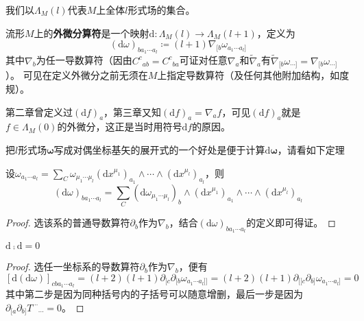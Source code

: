 我们以$\Lambda_M(l)$代表$M$上全体$l$形式场的集合。

\begin{definition}
    流形$M$上的\textbf{外微分算符}是一个映射$\mathrm{d} \colon \Lambda_M(l) \to \Lambda_M(l + 1)$，定义为
    $$(\mathrm{d}\omega)_{b a_1 \cdots a_l} \coloneq (l + 1)\nabla_{[b}\omega_{a_1 \cdots a_l]}$$
    其中$\nabla_b$为任一导数算符（因由$C^c{}_{ab} = C^c{}_{ba}$可证对任意$\nabla_a$和$\tilde\nabla_a$有$\tilde\nabla_{[b}\omega_{\cdots]} = \nabla_{[b}\omega_{\cdots]}$）。
    可见在定义外微分之前无须在$M$上指定导数算符（及任何其他附加结构，如度规）。
\end{definition}

\begin{example}
    第二章曾定义过$(\mathrm{d}f)_a$，第三章又知$(\mathrm{d}f)_a = \nabla_af$，可见$(\mathrm{d}f)_a$就是$f \in \Lambda_M(0)$的外微分，这正是当时用符号$\mathrm{d}f$的原因。
\end{example}

把$l$形式场$\bm\omega$写成对偶坐标基矢的展开式的一个好处是便于计算$\mathrm{d}\bm\omega$，请看如下定理

\begin{theorem}
    设$\omega_{a_1 \cdots a_l} = \sum\limits_C \omega_{\mu_1 \cdots \mu_l}(\mathrm{d}x^{\mu_1})_{a_1} \wedge \cdots \wedge (\mathrm{d}x^{\mu_l})_{a_l}$，则
    $$(\mathrm{d}\omega)_{b a_1 \cdots a_l} = \sum_C (\mathrm{d}\omega_{\mu_1 \cdots \mu_l})_b \wedge (\mathrm{d}x^{\mu_1})_{a_1} \wedge \cdots \wedge (\mathrm{d}x^{\mu_l})_{a_l}$$
\end{theorem}

\begin{proof}
    选该系的普通导数算符$\partial_b$作为$\nabla_b$，结合$(\mathrm{d}\omega)_{b a_1 \cdots a_l}$的定义即可得证。
\end{proof}

\begin{theorem}
    $\mathrm{d} \comp \mathrm{d} = 0$
\end{theorem}

\begin{proof}
    选任一坐标系的导数算符$\partial_b$作为$\nabla_b$，便有
    $$[\mathrm{d}(\mathrm{d}\omega)]_{c b a_1 \cdots a_l} = (l + 2)(l + 1)\partial_{[c}\partial_{[b}\omega_{a_1 \cdots a_l]]} = (l + 2)(l + 1)\partial_{[[c}\partial_{b]}\omega_{a_1 \cdots a_l]} = 0$$
    其中第二步是因为同种括号内的子括号可以随意增删，最后一步是因为$\partial_{[a}\partial_{b]}T^{\cdots}{}_{\cdots} = 0$。
\end{proof}


